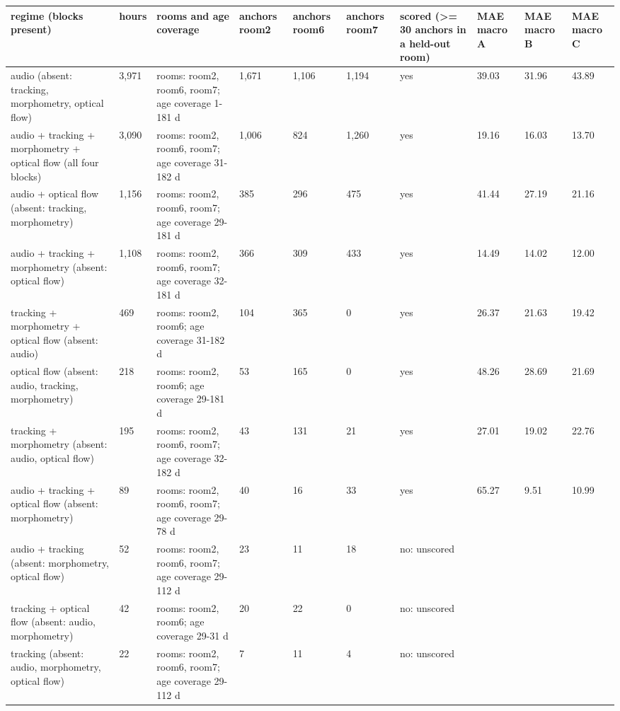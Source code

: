 \begin{tabular}{llllllllll}
\hline
regime (blocks present) & hours & rooms and age coverage & anchors room2 & anchors room6 & anchors room7 & scored (>= 30 anchors in a held-out room) & MAE macro A & MAE macro B & MAE macro C \\
\hline
audio  (absent: tracking, morphometry, optical flow) & 3,971 & rooms: room2, room6, room7; age coverage 1-181 d & 1,671 & 1,106 & 1,194 & yes & 39.03 & 31.96 & 43.89 \\
audio + tracking + morphometry + optical flow  (all four blocks) & 3,090 & rooms: room2, room6, room7; age coverage 31-182 d & 1,006 & 824 & 1,260 & yes & 19.16 & 16.03 & 13.70 \\
audio + optical flow  (absent: tracking, morphometry) & 1,156 & rooms: room2, room6, room7; age coverage 29-181 d & 385 & 296 & 475 & yes & 41.44 & 27.19 & 21.16 \\
audio + tracking + morphometry  (absent: optical flow) & 1,108 & rooms: room2, room6, room7; age coverage 32-181 d & 366 & 309 & 433 & yes & 14.49 & 14.02 & 12.00 \\
tracking + morphometry + optical flow  (absent: audio) & 469 & rooms: room2, room6; age coverage 31-182 d & 104 & 365 & 0 & yes & 26.37 & 21.63 & 19.42 \\
optical flow  (absent: audio, tracking, morphometry) & 218 & rooms: room2, room6; age coverage 29-181 d & 53 & 165 & 0 & yes & 48.26 & 28.69 & 21.69 \\
tracking + morphometry  (absent: audio, optical flow) & 195 & rooms: room2, room6, room7; age coverage 32-182 d & 43 & 131 & 21 & yes & 27.01 & 19.02 & 22.76 \\
audio + tracking + optical flow  (absent: morphometry) & 89 & rooms: room2, room6, room7; age coverage 29-78 d & 40 & 16 & 33 & yes & 65.27 & 9.51 & 10.99 \\
audio + tracking  (absent: morphometry, optical flow) & 52 & rooms: room2, room6, room7; age coverage 29-112 d & 23 & 11 & 18 & no: unscored &  &  &  \\
tracking + optical flow  (absent: audio, morphometry) & 42 & rooms: room2, room6; age coverage 29-31 d & 20 & 22 & 0 & no: unscored &  &  &  \\
tracking  (absent: audio, morphometry, optical flow) & 22 & rooms: room2, room6, room7; age coverage 29-112 d & 7 & 11 & 4 & no: unscored &  &  &  \\
\hline
\end{tabular}

